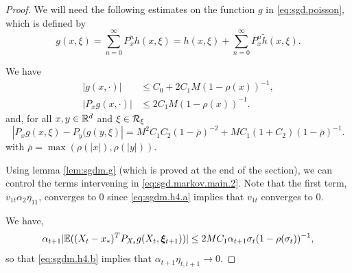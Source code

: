 \begin{proof}
We will need the following estimates on the function $g$ in \cref{eq:sgd.poisson}, which is defined by
\[
g(x, \xi) = \sum_{n=0}^\infty P_x^n h(x, \xi) = h(x, \xi) + \sum_{n=0}^\infty P_x^n \tilde h(x, \xi).
\]
\begin{lemma}
\label{lem:sgdm.g}
We have
\begin{subequations}
\begin{align}
\label{eq:sgdm.g.1a}
|g(x, \cdot)| &\leq C_0 + 2C_1M (1- \rho(x))^{-1},\\
\label{eq:sgdm.g.1b}
|P_xg(x, \cdot)| &\leq 2C_1M (1- \rho(x))^{-1}.
\end{align}
\end{subequations}
and, for all $x,y\in {\mathbb{R}}^d$ and $\xi\in {\mathcal R}_\xi$
\begin{equation}
\label{eq:sgdm.g.2}
|P_x g(x, \xi) - P_y(g(y, \xi)| = M^2C_1C_2 (1-\bar\rho)^{-2} + MC_1(1+C_2) (1-\bar \rho)^{-1}.
\end{equation}
with $\bar \rho = \max(\rho(|x|), \rho(|y|))$.

\end{lemma}

Using lemma \cref{lem:sgdm.g} (which is proved at the end of the section), we can control the terms intervening in   \cref{eq:sgd.markov.main.2}. Note that the first term, $v_{1t} \alpha_2 \eta_{11}$, converges to 0 since \cref{eq:sgdm.h4.a} implies that $v_{1t}$ converges to 0. 

We have,
\[
\alpha_{t+1} |\bm{\mathbb E}((X_{t} - x_*)^TP_{X_{t}} g(X_{t}, {\bm{\xi}}_{t+1}))| \leq 2MC_1 \alpha_{t+1} \sigma_t (1-\rho(\sigma_t))^{-1},
\]
so that \cref{eq:sgdm.h4.b} implies that $\alpha_{t+1}\eta_{t,t+1} \to 0$. 


\end{proof}
